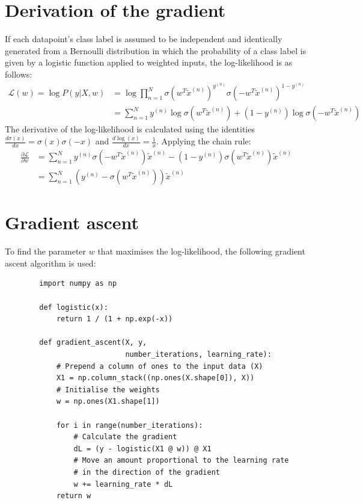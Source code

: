 \documentclass[a4paper]{article}
\begin{document}
    \section{Derivation of the gradient}\label{sec:derivation-of-the-gradient}
    If each datapoint's class label is assumed to be independent and identically generated from a Bernoulli distribution
    in which the probability of a class label is given by a logistic function applied to weighted inputs, the
    log-likelihood is as follows:
    \begin{align*}
        \mathcal{L}(w) = \log P(y|X, w) &= \log \prod_{n=1}^{N} \sigma(w^T \tilde{x}^{(n)})^{y^{(n)}}\sigma(-w^T \tilde{x}^{(n)})^{1-y^{(n)}} \\
        &= \sum_{n=1}^{N} y^{(n)} \log\sigma(w^T \tilde{x}^{(n)}) + (1-y^{(n)}) \log\sigma(-w^T \tilde{x}^{(n)})
    \end{align*}
    The derivative of the log-likelihood is calculated using the identities $\frac{d\sigma(x)}{dx} = \sigma(x)\sigma(-x)$
    and $\frac{d\log(x)}{dx} = \frac{1}{x}$. Applying the chain rule:
    \begin{align*}
        \frac{\partial \mathcal{L}}{\partial w} &= \sum_{n=1}^{N} y^{(n)} \sigma(-w^T \tilde{x}^{(n)}) \tilde{x}^{(n)} - (1-y^{(n)}) \sigma(w^T \tilde{x}^{(n)})  \tilde{x}^{(n)}
        \\ &= \sum_{n=1}^{N} \left(y^{(n)} - \sigma(w^T \tilde{x}^{(n)}) \right)  \tilde{x}^{(n)}
    \end{align*}

    \section{Gradient ascent}
    To find the parameter $w$ that maximises the log-likelihood, the following gradient ascent algorithm is used:

    \begin{verbatim}
        import numpy as np

        def logistic(x):
            return 1 / (1 + np.exp(-x))

        def gradient_ascent(X, y,
                            number_iterations, learning_rate):
            # Prepend a column of ones to the input data (X)
            X1 = np.column_stack((np.ones(X.shape[0]), X))
            # Initialise the weights
            w = np.ones(X1.shape[1])

            for i in range(number_iterations):
                # Calculate the gradient
                dL = (y - logistic(X1 @ w)) @ X1
                # Move an amount proportional to the learning rate
                # in the direction of the gradient
                w += learning_rate * dL
            return w
    \end{verbatim}
\end{document}

